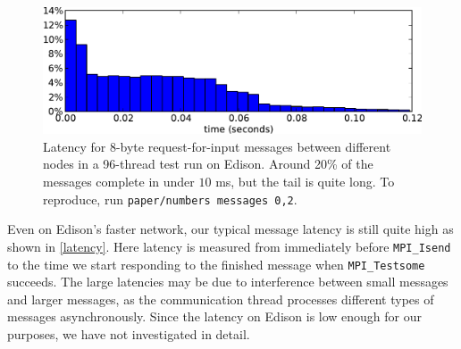 \documentclass[conference]{IEEEtran}
\begin{document}
\begin{figure}
\begin{center}
\includegraphics[width=\columnwidth]{request-latency.pdf}
\end{center}
\vspace{-.1in}
\cprotect\caption{Latency for 8-byte request-for-input messages between different nodes in a 96-thread test run
on Edison.  Around 20\% of the messages complete in under $10$ ms, but the tail is quite long.  To reproduce,
run \verb+paper/numbers messages 0,2+.}
\label{latency}
\vspace{-.1in}
\end{figure}

Even on Edison's faster network, our typical message latency is still quite high as shown in \autoref{latency}.
Here latency is measured from immediately before \verb+MPI_Isend+ to the time we start responding to the finished
message when \verb+MPI_Testsome+ succeeds.  The large latencies may be due to interference between small messages
and larger messages, as the communication thread processes different types of messages asynchronously.  Since
the latency on Edison is low enough for our purposes, we have not investigated in detail.

\end{document}
